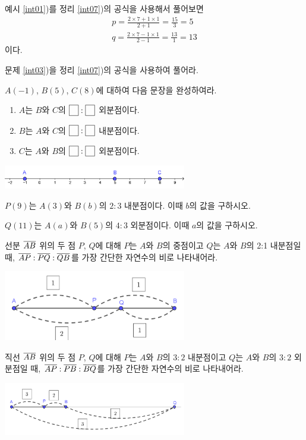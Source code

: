 \documentclass{oblivoir}
\begin{document}
%
\exam{}
예시 \ref{int01})를
 정리 \ref{int07})의 공식을 사용해서 풀어보면
\begin{gather*}
p=\frac{2\times7+1\times1}{2+1}=\frac{15}3=5\\
q=\frac{2\times7-1\times1}{2-1}=\frac{13}1=13
\end{gather*}
이다.

%
\prob{}\label{int10}
문제 \ref{int03})을 정리 \ref{int07})의 공식을 사용하여 풀어라.

%
\prob{}\label{int11}
\(A(-1)\), \(B(5)\), \(C(8)\)에 대하여 다음 문장을 완성하여라.
\begin{enumerate}
\item
\(A\)는 \(B\)와 \(C\)의 \(\pb4:\pb4\) 외분점이다.
\item
\(B\)는 \(A\)와 \(C\)의 \(\pb4:\pb4\) 내분점이다.
\item
\(C\)는 \(A\)와 \(B\)의 \(\pb4:\pb4\) 외분점이다.
\end{enumerate}
\begin{center}
\includegraphics[width=0.6\textwidth]{int_11}
\end{center}

%
\prob{}\label{int12}
\(P(9)\)는 \(A(3)\)와 \(B(b)\)의 \(2:3\) 내분점이다.
이때 \(b\)의 값을 구하시오.

%
\prob{}\label{int13}
\(Q(11)\)는 \(A(a)\)와 \(B(5)\)의 \(4:3\) 외분점이다.
이때 \(a\)의 값을 구하시오.

%
\prob{}\label{int14}
선분 \(\overline{AB}\) 위의 두 점 \(P\), \(Q\)에 대해 \(P\)는 \(A\)와 \(B\)의 중점이고 \(Q\)는 \(A\)와 \(B\)의 2:1 내분점일 때, \(\overline{AP}:\overline{PQ}:\overline{QB}\)를 가장 간단한 자연수의 비로 나타내어라.
\begin{center}
\includegraphics[width=0.6\textwidth]{int_14}
\end{center}

%
\prob{}\label{int15}
직선 \(\overline{AB}\) 위의 두 점 \(P\), \(Q\)에 대해 \(P\)는 \(A\)와 \(B\)의 \(3:2\) 내분점이고 \(Q\)는 \(A\)와 \(B\)의 \(3:2\) 외분점일 때, \(\overline{AP}:\overline{PB}:\overline{BQ}\)를 가장 간단한 자연수의 비로 나타내어라.
\begin{center}
\includegraphics[width=0.6\textwidth]{int_15}
\end{center}
\end{document}
